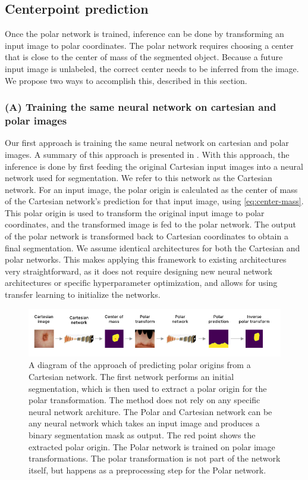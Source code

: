     \subsection{Centerpoint prediction}
    
Once the polar network is trained, inference can be done by transforming an input image to polar 
coordinates. The polar network requires choosing a center that is close to the center of mass of the 
segmented object. Because a future input image is unlabeled, the correct center needs to be inferred from 
the image. We propose two ways to accomplish this, described in this section.

   \subsubsection{(A) Training the same neural network on cartesian and polar images}
   \label{retraining-approach}
   
Our first approach is training the same neural network on cartesian and polar images. A summary of this
approach is presented in . With this approach, 
the inference is done by first feeding the original Cartesian input images into a neural 
network used for segmentation. We refer to this network as the Cartesian network.
For an input image, the polar origin is calculated as the center of mass of the Cartesian network's
prediction for that input image, using \eqref{eq:center-mass}.
This polar origin is used to transform the original input image to polar coordinates, and the transformed 
image is fed
to the polar network. The output of the polar network is transformed back to Cartesian coordinates
to obtain a final segmentation. We assume 
identical architectures for both the Cartesian and polar networks. This makes applying this
framework to existing architectures very straightforward, as it does not require designing new neural 
network architectures or specific hyperparameter optimization, and allows for using transfer learning to
initialize the networks.

	\begin{figure}[h!]
		\centering
		\includegraphics[width=\linewidth]{images/4/retraining-approach}
		\caption{A diagram of the approach of predicting polar origins from a Cartesian network. The first network performs an initial segmentation, which is then used to extract a polar origin for the polar transformation. The method does not rely on any specific neural network architure. The Polar and Cartesian network can be any neural network which takes an input image and produces a binary segmentation mask as output. The red point shows the extracted polar origin. The Polar network is trained on polar image transformations. The polar transformation is not part of the network itself, but happens as a preprocessing step for the Polar network.}
		\label{fig:retraining-diagram}
	\end{figure}
	
